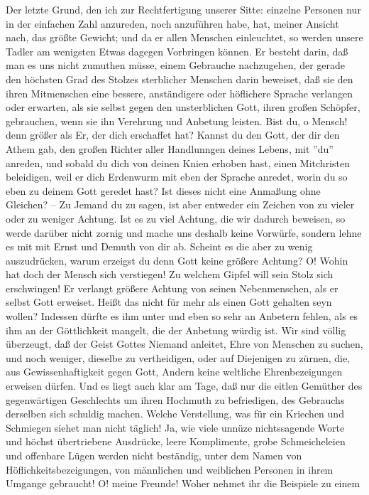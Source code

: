 Der letzte Grund, den ich zur Rechtfertigung unserer Sitte: einzelne Personen
nur in der einfachen Zahl anzureden, noch anzuführen habe, hat, meiner Ansicht
nach, das größte Gewicht; und da er allen Menschen einleuchtet, so werden unsere
Tadler am wenigsten Etwas dagegen Vorbringen können. Er besteht darin, daß man
es uns nicht zumuthen müsse, einem Gebrauche nachzugehen, der gerade den
höchsten Grad des Stolzes sterblicher Menschen darin beweiset, daß sie den ihren
Mitmenschen eine bessere, anständigere oder höflichere Sprache verlangen oder
erwarten, als sie selbst gegen den unsterblichen Gott, ihren großen Schöpfer,
gebrauchen, wenn sie ihn Verehrung und Anbetung leisten. Bist du, o Mensch! denn
größer als Er, der dich erschaffet hat? Kannst du den Gott, der dir den Athem
gab, den großen Richter aller Handlunngen deines Lebens, mit ''du'' anreden, und
sobald du dich von deinen Knien erhoben hast, einen Mitchristen beleidigen, weil
er dich Erdenwurm mit eben der Sprache anredet, worin du so eben zu deinem Gott
geredet hast? Ist dieses nicht eine Anmaßung ohne Gleichen? -- Zu Jemand du zu
sagen, ist aber entweder ein Zeichen von zu vieler oder zu weniger Achtung. Ist
es zu viel Achtung, die wir dadurch beweisen, so werde darüber nicht zornig und
mache uns deshalb keine Vorwürfe, sondern lehne es mit mit Ernst und Demuth von
dir ab. Scheint es die aber zu wenig auszudrücken, warum erzeigst du denn Gott
keine größere Achtung? O! Wohin hat doch der Mensch sich verstiegen! Zu welchem
Gipfel will sein Stolz sich erschwingen! Er verlangt größere Achtung von seinen
Nebenmenschen, als er selbst Gott erweiset. Heißt das nicht für mehr als einen
Gott gehalten seyn wollen? Indessen dürfte es ihm unter und eben so sehr an
Anbetern fehlen, als es ihm an der Göttlichkeit mangelt, die der Anbetung würdig
ist. Wir sind völlig überzeugt, daß der Geist Gottes Niemand anleitet, Ehre von
Menschen zu suchen, und noch weniger, dieselbe zu vertheidigen, oder auf
Diejenigen zu zürnen, die, aus Gewissenhaftigkeit gegen Gott, Andern keine
weltliche Ehrenbezeigungen erweisen dürfen. Und es liegt auch klar am Tage, daß
nur die eitlen Gemüther des gegenwärtigen Geschlechts um ihren Hochmuth zu
befriedigen, des Gebrauchs derselben sich schuldig machen. Welche Verstellung,
was für ein Kriechen und Schmiegen siehet man nicht täglich! Ja, wie viele
unnüze nichtssagende Worte und höchst übertriebene Ausdrücke, leere Komplimente,
grobe Schmeicheleien und offenbare Lügen werden nicht beständig, unter dem Namen
von Höflichkeitsbezeigungen, von männlichen und weiblichen Personen in ihrem
Umgange gebraucht! O! meine Freunde! Woher nehmet ihr die Beispiele zu einem
